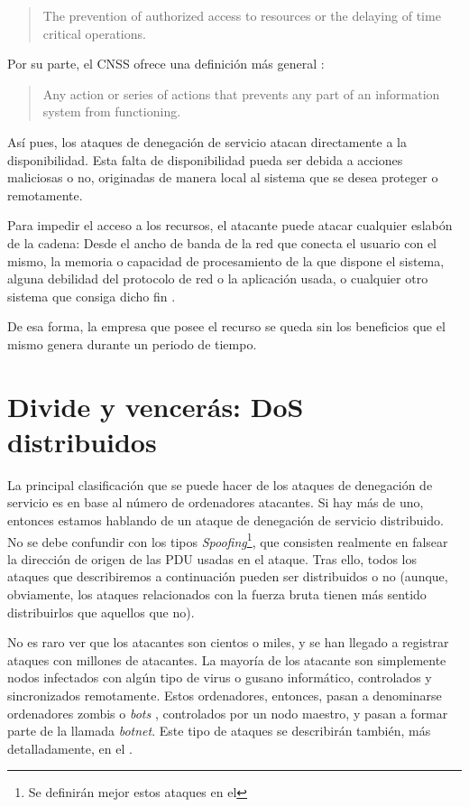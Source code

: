 \begin{quote}
 The prevention of authorized access to resources or the delaying of time critical operations.
\end{quote}

Por su parte, el \gls{CNSS} ofrece una definición más general \cite{CCNS_DDoS_def}:

\begin{quote}
 Any action or series of actions that prevents any part of an information system from functioning.
\end{quote}

Así pues, los ataques de denegación de servicio atacan directamente a la disponibilidad. Esta falta de disponibilidad 
pueda ser debida a acciones maliciosas o no, originadas de manera local al sistema que se desea proteger o remotamente.

Para impedir el acceso a los recursos, el atacante puede atacar cualquier eslabón de la cadena: Desde el ancho de banda 
de la red que conecta el usuario con el mismo, la memoria o capacidad de procesamiento de la que dispone el sistema, 
alguna debilidad del protocolo de red o la aplicación usada, o cualquier otro sistema que consiga dicho fin 
\cite{Raghavan}.

De esa forma, la empresa que posee el recurso se queda sin los beneficios que el mismo genera durante un periodo de 
tiempo. 

\section{Divide y vencerás: DoS distribuidos}
La principal clasificación que se puede hacer de los ataques de denegación de servicio es en base al número de 
ordenadores atacantes. Si hay más de uno, entonces estamos hablando de un ataque de denegación de servicio distribuido. 
No se debe confundir con los tipos \emph{Spoofing}\footnote{Se definirán mejor estos ataques en el 
}, que consisten realmente en falsear la dirección de origen de 
las PDU usadas en el ataque. Tras ello, todos los ataques que describiremos a continuación pueden ser distribuidos o no 
(aunque, obviamente, los ataques relacionados con la fuerza bruta tienen más sentido distribuirlos que aquellos que no).

No es raro ver que los atacantes son cientos o miles, y se han llegado a registrar ataques con millones de atacantes. 
La mayoría de los atacante son simplemente nodos infectados con algún tipo de virus o gusano informático, controlados 
y sincronizados remotamente. Estos ordenadores, entonces, pasan a denominarse ordenadores zombis o \emph{bots} 
 , controlados por un nodo maestro, y pasan a formar parte de la llamada 
\emph{botnet}. Este tipo de ataques se describirán también, más detalladamente, en el .

